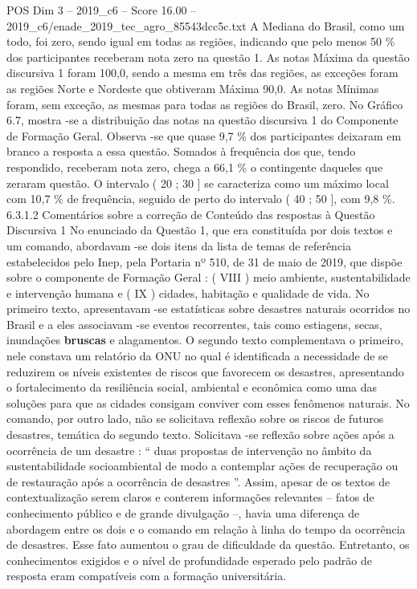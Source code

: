 \begin{textsample}{POS Dim 3 – 2019\_c6 – Score 16.00 – 2019\_c6/enade\_2019\_tec\_agro\_85543dcc5c.txt}
A Mediana do Brasil, como um todo, foi zero, sendo igual em todas as regiões, indicando que pelo menos 50 \% dos participantes receberam nota zero na questão 1.
As notas Máxima da questão discursiva 1 foram 100,0, sendo a mesma em três das regiões, as exceções foram as regiões Norte e Nordeste que obtiveram Máxima 90,0.
As notas Mínimas foram, sem exceção, as mesmas para todas as regiões do Brasil, zero.
No Gráfico 6.7, mostra -se a distribuição das notas na questão discursiva 1 do Componente de Formação Geral.
Observa -se que quase 9,7 \% dos participantes deixaram em branco a resposta a essa questão.
Somados à frequência dos que, tendo respondido, receberam nota zero, chega a 66,1 \% o contingente daqueles que zeraram questão.
O intervalo ( 20 ; 30 ] se caracteriza como um máximo local com 10,7 \% de frequência, seguido de perto do intervalo ( 40 ; 50 ], com 9,8 \%. 6.3.1.2 Comentários sobre a correção de Conteúdo das respostas à Questão Discursiva 1 No enunciado da Questão 1, que era constituída por dois textos e um comando, abordavam -se dois itens da lista de temas de referência estabelecidos pelo Inep, pela Portaria nº 510, de 31 de maio de 2019, que dispõe sobre o componente de Formação Geral : ( VIII ) meio ambiente, sustentabilidade e intervenção humana e ( IX ) cidades, habitação e qualidade de vida.
No primeiro texto, apresentavam -se estatísticas sobre desastres naturais ocorridos no Brasil e a eles associavam -se eventos recorrentes, tais como estiagens, secas, inundações \textbf{bruscas} e alagamentos.
O segundo texto complementava o primeiro, nele constava um relatório da ONU no qual é identificada a necessidade de se reduzirem os níveis existentes de riscos que favorecem os desastres, apresentando o fortalecimento da resiliência social, ambiental e econômica como uma das soluções para que as cidades consigam conviver com esses fenômenos naturais.
No comando, por outro lado, não se solicitava reflexão sobre os riscos de futuros desastres, temática do segundo texto.
Solicitava -se reflexão sobre ações após a ocorrência de um desastre : “ duas propostas de intervenção no âmbito da sustentabilidade socioambiental de modo a contemplar ações de recuperação ou de restauração após a ocorrência de desastres ”.
Assim, apesar de os textos de contextualização serem claros e conterem informações relevantes – fatos de conhecimento público e de grande divulgação –, havia uma diferença de abordagem entre os dois e o comando em relação à linha do tempo da ocorrência de desastres.
Esse fato aumentou o grau de dificuldade da questão.
Entretanto, os conhecimentos exigidos e o nível de profundidade esperado pelo padrão de resposta eram compatíveis com a formação universitária.

\end{textsample}
